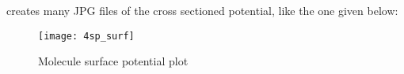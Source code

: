 \medskip

creates many JPG files of the cross sectioned potential, like the one given below:

\begin{figure}[!htbp]
  \centering
    \texttt{[image: 4sp\_surf]}
    \caption{Molecule surface potential plot}
\end{figure}

	
%
%
%
%
%
%
%
%




